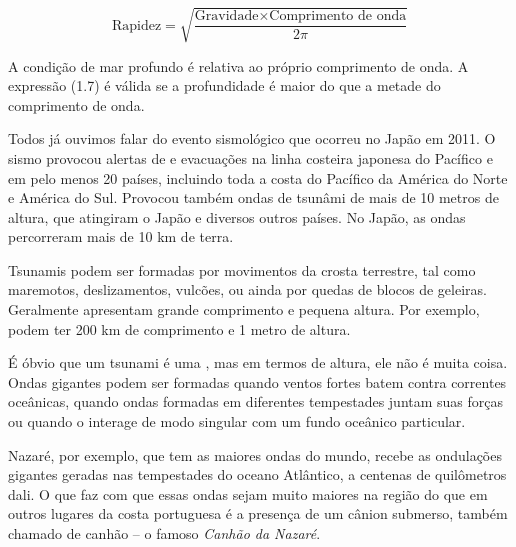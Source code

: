 \documentclass[book, 12pt, twoside, a5paper, english, brazil, sumario=tradicional, openany]{abntex2}
\begin{document}
\vspace{-0.3cm}

\begin{equation}
    \text{Rapidez} = \sqrt{\dfrac{\text{Gravidade} \times \text{Comprimento de onda}}{2\pi}}
\end{equation}

\vspace{0.1cm}

A condição de mar profundo é relativa ao próprio comprimento de onda. A expressão (1.7) é válida
se a profundidade é maior do que a metade do comprimento de onda.

{}

\vspace{-0.3cm}

Todos já ouvimos falar do evento sismológico que ocorreu no Japão em 2011. O sismo provocou alertas de {\color{celestialblue}{tsunâmi}} e evacuações na linha costeira japonesa do Pacífico e em pelo menos 20 países, incluindo toda a costa do Pacífico da América do Norte e América do Sul. Provocou também ondas de tsunâmi de mais de 10 metros de altura, que atingiram o Japão e diversos outros países. No Japão, as ondas percorreram mais de 10 km de terra.

Tsunamis podem ser formadas por movimentos da crosta terrestre, tal como maremotos, deslizamentos, vulcões, ou ainda por quedas de blocos de geleiras. Geralmente apresentam grande comprimento e pequena altura. Por exemplo,
podem ter 200 km de comprimento e 1 metro de altura.

É óbvio que um tsunami é uma {\color{celestialblue}{onda gigante}}, mas em termos de altura, ele não é muita coisa. Ondas gigantes podem ser formadas quando ventos fortes batem contra
correntes oceânicas, quando ondas formadas em diferentes tempestades juntam suas forças ou quando o {\color{celestialblue}{swell}} interage de modo singular com um fundo oceânico particular. 

Nazaré, por exemplo, que tem as maiores ondas do mundo, recebe as ondulações gigantes geradas nas tempestades do oceano Atlântico, a centenas de quilômetros dali. O que faz com que essas ondas sejam muito maiores na região do que em outros lugares da costa portuguesa é a presença de um cânion submerso, também chamado de canhão – o famoso \textit{Canhão da Nazaré}. 
\end{document}
